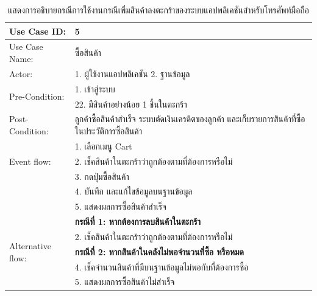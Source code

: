 \begin{table}[htbp]
  \centering
  \caption{แสดงการอธิบายกรณีการใช้งานกรณีเพิ่มสินค้าลงตะกร้าของระบบแอปพลิเคชันสำหรับโทรศัพท์มือถือ}
  \begin{tabularx}{\textwidth}{|p{3cm}|X|}
    \hline
    \multirow{1}{3cm}{Use Case ID:}      & 5                                                                        \\
    \hline
    \multirow{1}{3cm}{Use Case Name:}    & ซื้อสินค้า                                                                   \\
    \hline
    \multirow{1}{3cm}{Actor:}            & 1. ผู้ใช้งานแอปพลิเคชัน 2. ฐานข้อมูล                                            \\
    \hline
    \multirow{2}{3cm}{Pre-Condition:}    & 1. เข้าสู่ระบบ                                                              \\ & 22. มีสินค้าอย่างน้อย 1 ชิ้นในตะกร้า \\
    \hline
    \multirow{1}{3cm}{Post-Condition:}   & ลูกค้าซื้อสินค้าสำเร็จ ระบบตัดเงินเครดิตของลูกค้า และเก็บรายการสินค้าที่ซื้อในประวัติการซื้อสินค้า \\
    \hline
    \multirow{3}{3cm}{Event flow:}       & 1. เลือกเมนู Cart                                                          \\
                                         & 2. เช็คสินค้าในตะกร้าว่าถูกต้องตามที่ต้องการหรือไม่                                  \\ & 3. กดปุ่มซื้อสินค้า \\
                                         & 4. บันทึก และแก้ไขข้อมูลบนฐานข้อมูล                                             \\ & 5. แสดงผลการซื้อสินค้าสำเร็จ \\
    \hline
    \multirow{5}{3cm}{Alternative flow:} & \textbf{กรณีที่ 1: หากต้องการลบสินค้าในตะกร้า}                                  \\
                                         & 2. เช็คสินค้าในตะกร้าว่าถูกต้องตามที่ต้องการหรือไม่                                  \\ & \textbf{กรณีที่ 2: หากสินค้าในคลังไม่พอจำนวนที่ซื้อ หรือหมด} \\
                                         & 4. เช็คจำนวนสินค้าที่มีบนฐานข้อมูลไม่พอกับที่ต้องการซื้อ                                 \\ & 5. แสดงผลการซื้อสินค้าไม่สำเร็จ \\
    \hline
  \end{tabularx}
\end{table}


